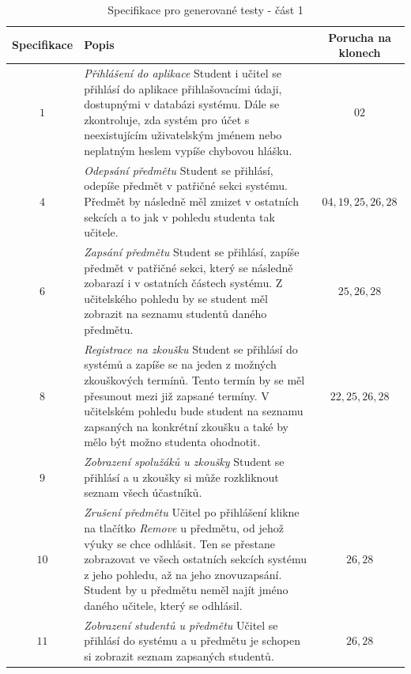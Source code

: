 \documentclass[czech, ma, kiv, he, iso690alph, pdf, viewonly]{fasthesis}
\begin{document}
    \begin{table}
        \begin{tabular}{|c|p{7cm}|c|}
            \hline
            \textbf{Specifikace} & \textbf{Popis} & \textbf{Porucha na klonech} \\
            \hline
            \(1\) & \textit{Přihlášení do aplikace} \newline Student i učitel se přihlásí do aplikace přihlašovacími údaji, dostupnými v databázi systému. Dále se zkontroluje, zda systém pro účet s neexistujícím uživatelským jménem nebo neplatným heslem vypíše chybovou hlášku. &  \(02\) \\
            \hline
            \(4\) & \textit{Odepsání předmětu} \newline Student se přihlásí, odepíše předmět v patřičné sekci systému. Předmět by následně měl zmizet v ostatních sekcích a to jak v pohledu studenta tak učitele. & \(04, 19, 25, 26, 28\) \\
            \hline
            \(6\) & \textit{Zapsání předmětu} \newline Student se přihlásí, zapíše předmět v patřičné sekci, který se následně zobarazí i v ostatních částech systému. Z učitelského pohledu by se student měl zobrazit na seznamu studentů daného předmětu. & \(25, 26, 28\) \\
            \hline
            \(8\) & \textit{Registrace na zkoušku} \newline Student se přihlásí do systémů a zapíše se na jeden z možných zkouškových termínů. Tento termín by se měl přesunout mezi již zapsané termíny. V učitelském pohledu bude student na seznamu zapsaných na konkrétní zkoušku a také by mělo být možno studenta ohodnotit. & \(22, 25, 26, 28\) \\
            \hline
            \(9\) & \textit{Zobrazení spolužáků u zkoušky} \newline Student se přihlásí a u zkoušky si může rozkliknout seznam všech účastníků. & \(\) \\
            \hline
            \(10\) & \textit{Zrušení předmětu} \newline Učitel po přihlášení klikne na tlačítko \textit{Remove} u předmětu, od jehož výuky se chce odhlásit. Ten se přestane zobrazovat ve všech ostatních sekcích systému z jeho pohledu, až na jeho znovuzapsání. Student by u předmětu neměl najít jméno daného učitele, který se odhlásil. & \(26, 28\) \\
            \hline
            \(11\) & \textit{Zobrazení studentů u předmětu} \newline Učitel se přihlásí do systému a u předmětu je schopen si zobrazit seznam zapsaných studentů. & \(26, 28\) \\
            \hline
        \end{tabular}
        \centering
        \label{tab:specs_1}
        \caption{Specifikace pro generované testy - část 1}
    \end{table}
\end{document}
